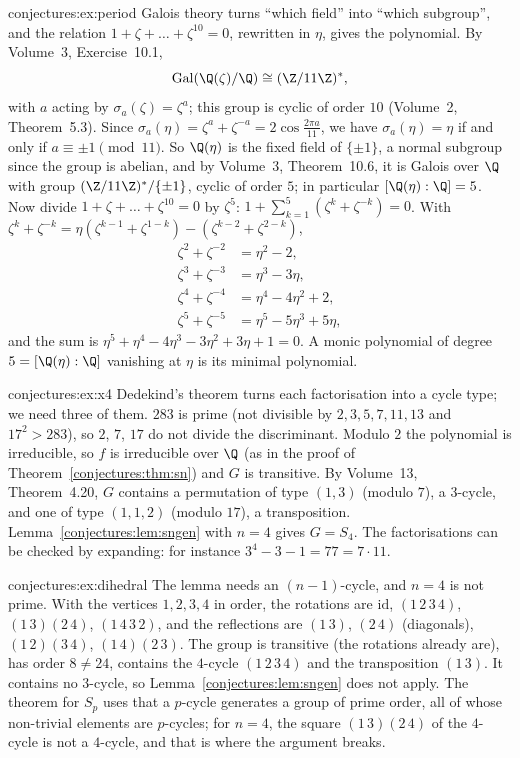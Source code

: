 \begin{solution}{conjectures:ex:period}
\idea Galois theory turns ``which field'' into ``which subgroup'', and the relation $1+\zeta+\dots+\zeta^{10}=0$, rewritten in $\eta$, gives the polynomial.
\writeup By Volume~3, Exercise~10.1,
\[
\operatorname{Gal}(\Q(\zeta)/\Q)\cong(\Z/11\Z)^*,
\]
with $a$ acting by $\sigma_a(\zeta)=\zeta^a$; this group is cyclic of order $10$ (Volume~2, Theorem~5.3). Since $\sigma_a(\eta)=\zeta^a+\zeta^{-a}=2\cos\frac{2\pi a}{11}$, we have $\sigma_a(\eta)=\eta$ if and only if
$a\equiv\pm1\pmod{11}$. So $\Q(\eta)$ is the fixed field of $\{\pm1\}$, a normal subgroup since the group is abelian, and by Volume~3, Theorem~10.6, it is
Galois over $\Q$ with group $(\Z/11\Z)^*/\{\pm1\}$, cyclic of order $5$; in particular $[\Q(\eta):\Q]=5$. Now divide $1+\zeta+\dots+\zeta^{10}=0$ by
$\zeta^5$: $1+\sum_{k=1}^5(\zeta^k+\zeta^{-k})=0$. With $\zeta^k+\zeta^{-k}=\eta(\zeta^{k-1}+\zeta^{1-k})-(\zeta^{k-2}+\zeta^{2-k})$,
\[
\begin{aligned}
\zeta^2+\zeta^{-2}&=\eta^2-2,\\
\zeta^3+\zeta^{-3}&=\eta^3-3\eta,\\
\zeta^4+\zeta^{-4}&=\eta^4-4\eta^2+2,\\
\zeta^5+\zeta^{-5}&=\eta^5-5\eta^3+5\eta,
\end{aligned}
\]
and the sum is $\eta^5+\eta^4-4\eta^3-3\eta^2+3\eta+1=0$. A monic polynomial of degree $5=[\Q(\eta):\Q]$ vanishing at $\eta$ is its minimal polynomial.
\end{solution}

\begin{solution}{conjectures:ex:x4}
\idea Dedekind's theorem turns each factorisation into a cycle type; we need three of them.
\writeup $283$ is prime (not divisible by $2,3,5,7,11,13$ and $17^2>283$), so $2$, $7$, $17$ do not divide the discriminant. Modulo $2$ the polynomial is
irreducible, so $f$ is irreducible over $\Q$ (as in the proof of Theorem~\ref{conjectures:thm:sn}) and $G$ is transitive. By Volume~13, Theorem~4.20, $G$ contains a
permutation of type $(1,3)$ (modulo $7$), a $3$-cycle, and one of type $(1,1,2)$ (modulo $17$), a transposition. Lemma~\ref{conjectures:lem:sngen} with $n=4$ gives
$G=S_4$. The factorisations can be checked by expanding: for instance $3^4-3-1=77=7\cdot11$.
\end{solution}

\begin{solution}{conjectures:ex:dihedral}
\idea The lemma needs an $(n-1)$-cycle, and $n=4$ is not prime.
\writeup With the vertices $1,2,3,4$ in order, the rotations are $\mathrm{id}$, $(1\,2\,3\,4)$, $(1\,3)(2\,4)$, $(1\,4\,3\,2)$, and the reflections are
$(1\,3)$, $(2\,4)$ (diagonals), $(1\,2)(3\,4)$, $(1\,4)(2\,3)$. The group is transitive (the rotations already are), has order $8\ne24$, contains the
$4$-cycle $(1\,2\,3\,4)$ and the transposition $(1\,3)$. It contains no $3$-cycle, so Lemma~\ref{conjectures:lem:sngen} does not apply. The theorem for $S_p$ uses that
a $p$-cycle generates a group of prime order, all of whose non-trivial elements are $p$-cycles; for $n=4$, the square $(1\,3)(2\,4)$ of the $4$-cycle is
not a $4$-cycle, and that is where the argument breaks.
\end{solution}

